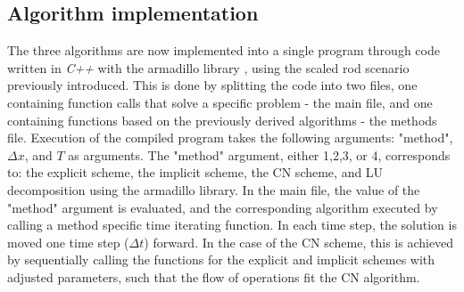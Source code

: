 \documentclass[%
oneside,                 %
final,                   %
10pt]{article}
\begin{document}
\begin{center}\end{center}


\subsection{Algorithm implementation}
\label{M.AlgoImpl}	
The three algorithms are now implemented into a single program through code written in \textit{C++} with the armadillo library \cite{armadillo}, using the scaled rod scenario previously introduced. This is done by splitting the code into two files, one containing function calls that solve a specific problem - the main file, and one containing functions   based on the previously derived algorithms - the methods file. Execution of the compiled program takes the following arguments: "method", $\Delta x$, and $T$ as arguments. The "method" argument, either 1,2,3, or 4, corresponds to: the explicit scheme, the implicit scheme, the CN scheme, and LU decomposition using the armadillo library. In the main file, the value of the "method" argument is evaluated, and the corresponding algorithm executed by calling a method specific time iterating function. In each time step, the solution is moved one time step ($\Delta t$) forward. In the case of the CN scheme, this is achieved by sequentially calling the functions for the explicit and implicit schemes with adjusted parameters, such that the flow of operations fit the CN algorithm.
\end{document}
